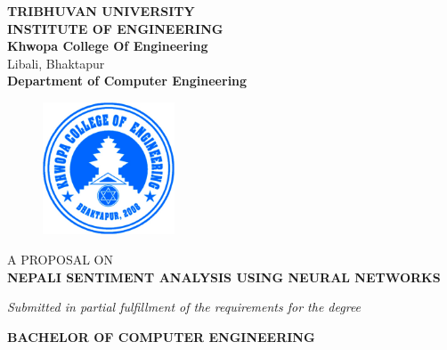     \begin{center}
		\thispagestyle{empty}
		\Large\textbf{TRIBHUVAN UNIVERSITY}\\
		\Large\textbf{INSTITUTE OF ENGINEERING }\\
		\vspace{0.2in}
		\large{\textbf{Khwopa College Of Engineering}\\}
		\normalsize{Libali, Bhaktapur\\}
		\large\textbf{Department of Computer Engineering}
		\vspace{0.2in}
		\begin{figure}[h]
		    \centering
			    \includegraphics[width=0.35\textwidth]{img/Khwopalogo.jpg}
		\end{figure}
		
		\vspace{0.2in}
		\large{A PROPOSAL ON\\\textbf{NEPALI SENTIMENT ANALYSIS USING NEURAL NETWORKS}\\}
		
		\vspace{0.2in}
		\large{\textit{Submitted in partial fulfillment of the requirements for the degree\\}}
		
		\vspace{0.2in}
		\large{\textbf{BACHELOR OF COMPUTER ENGINEERING}\\}
		

\end{center}
